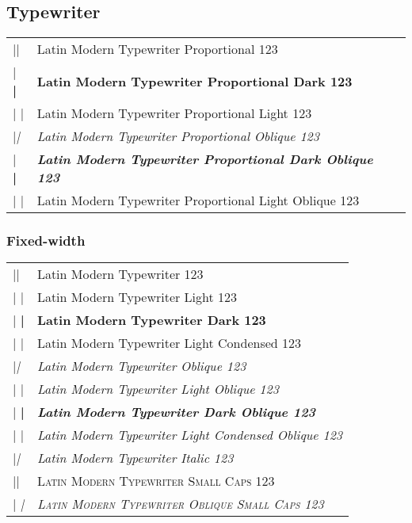 \documentclass{article}
\makeatletter
\newenvironment{vrb}{\begin{tabular}{@{}p{5cm}l@{}}}{\end{tabular}}
\makeatother
\begin{document}
\subsection*{Typewriter}

\ttfamily
\tvstyle
\begin{vrb}
|\ttfamily\tvstyle | & {Latin Modern Typewriter Proportional 123} \\
|  \bfseries | & {\bfseries Latin Modern Typewriter Proportional Dark 123} \\
|  \lgweight | & {\lgweight Latin Modern Typewriter Proportional Light 123} \\
|\slshape | & {\slshape Latin Modern Typewriter Proportional Oblique 123} \\
|  \bfseries | & {\bfseries\slshape Latin Modern Typewriter Proportional Dark Oblique 123} \\
|  \lgweight | & {\lgweight Latin Modern Typewriter Proportional Light Oblique 123} \\
\end{vrb}

\subsubsection*{Fixed-width}

\tmstyle
\begin{vrb}
|\ttfamily\tmstyle | & {Latin Modern Typewriter 123} \\
|  \lgweight | & {\lgweight Latin Modern Typewriter Light 123} \\
|  \bfseries | & {\bfseries Latin Modern Typewriter Dark 123} \\
|  \fontseries{lc}\selectfont | & {\fontseries{lc}\selectfont Latin Modern Typewriter Light Condensed 123} \\
|\slshape | & {\slshape Latin Modern Typewriter Oblique 123} \\
|  \lgweight | & {\lgweight\slshape Latin Modern Typewriter Light Oblique 123} \\
|  \bfseries | & {\bfseries\slshape Latin Modern Typewriter Dark Oblique 123} \\
|  \fontseries{lc} | & {\fontseries{lc}\slshape Latin Modern Typewriter Light Condensed Oblique 123} \\
|\itshape | & {\itshape Latin Modern Typewriter Italic 123} \\
|\scshape | & {\scshape Latin Modern Typewriter Small Caps 123} \\
|  \slshape | & {\scshape\slshape Latin Modern Typewriter Oblique Small Caps 123} \\
\end{vrb}
\end{document}
